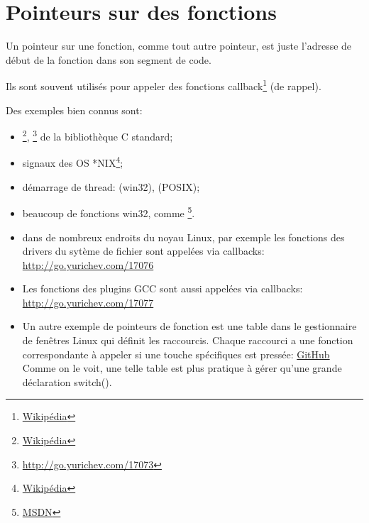 \newcommand{\comp}{\TT{comp()}\xspace}
\section{Pointeurs sur des fonctions}
\label{sec:pointerstofunctions}

\myindex{\CLanguageElements!\Pointers}

Un pointeur sur une fonction, comme tout autre pointeur, est juste l'adresse de début
de la fonction dans son segment de code.

Ils sont souvent utilisés pour appeler des fonctions callback\footnote{\href{http://go.yurichev.com/17071}{Wikipédia}}
(de rappel).

Des exemples bien connus sont:

\begin{itemize}
\item \qsort\footnote{\href{http://go.yurichev.com/17072}{Wikipédia}},
{}\footnote{\url{http://go.yurichev.com/17073}} de la bibliothèque C standard; 

\item signaux des OS *NIX\footnote{\href{http://go.yurichev.com/17074}{Wikipédia}};

\item démarrage de thread:  (win32),  (POSIX);

\item beaucoup de fonctions win32, comme \footnote{\href{http://go.yurichev.com/17075}{MSDN}}.

\item dans de nombreux endroits du noyau Linux, par exemple les fonctions des drivers
du sytème de fichier sont appelées via callbacks: \url{http://go.yurichev.com/17076}

\item Les fonctions des plugins GCC sont aussi appelées via callbacks: 
\url{http://go.yurichev.com/17077}

\item Un autre exemple de pointeurs de fonction est une table dans le gestionnaire
de fenêtres Linux  qui définit les raccourcis. Chaque raccourci a une fonction
correspondante à appeler si une touche spécifiques est pressée: \href{http://go.yurichev.com/17078}{GitHub}
Comme on le voit, une telle table est plus pratique à gérer qu'une grande déclaration
switch().
\end{itemize}

